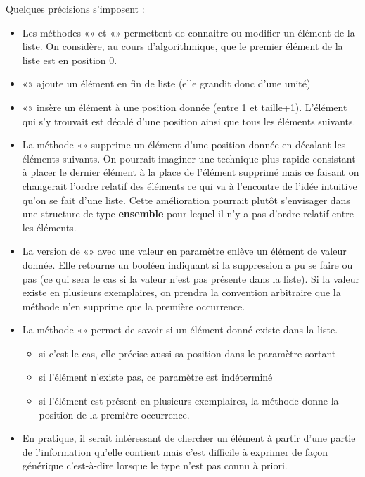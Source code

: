 		Quelques précisions s’imposent :
		\begin{itemize}
			\item 
				Les méthodes «» et «»
				permettent de connaitre ou modifier un élément de la liste. On
				considère, au cours d'algorithmique, que le premier élément de 
				la liste est en position 0.
			\item 
				«» ajoute un élément en fin de liste (elle
				grandit donc d’une unité)
			\item 
				«» insère un élément à une position donnée
				(entre 1 et taille+1). L’élément qui s’y trouvait est décalé
				d'une position ainsi que tous les éléments suivants.
			\item 
				La méthode «»
				supprime un élément d'une position donnée en
				décalant les éléments suivants. On pourrait imaginer une technique plus
				rapide consistant à placer le dernier élément à la place de l’élément
				supprimé mais ce faisant on changerait l’ordre relatif des éléments ce
				qui va à l’encontre de l’idée intuitive qu’on se fait d’une liste.
				Cette amélioration pourrait plutôt s’envisager dans une structure de
				type \textbf{ensemble} pour lequel il n’y a pas d’ordre relatif entre
				les éléments.
			\item 
				La version de «» avec une valeur en
				paramètre enlève un élément de valeur donnée. Elle retourne un booléen
				indiquant si la suppression a pu se faire ou pas (ce qui sera le cas si
				la valeur n’est pas présente dans la liste). Si la valeur existe en
				plusieurs exemplaires, on prendra la convention arbitraire que
				la méthode n’en supprime que la première	occurrence.
			\item 
				La méthode «» permet de savoir si un élément
				donné existe dans la liste. 
				\begin{itemize}
					\item 
						si c’est le cas, elle précise aussi sa position dans le paramètre sortant 
					\item 
						si l’élément n’existe pas, ce paramètre est	indéterminé 
					\item 
						si l’élément est présent en plusieurs exemplaires, la méthode donne la
						position de la première occurrence.
				\end{itemize}
			\item 
				En pratique, il serait intéressant de chercher un élément à partir d’une
				partie de l’information qu’elle contient mais c’est difficile à
				exprimer de façon générique c'est-à-dire lorsque le
				type n'est pas connu à priori.
		\end{itemize}
		
